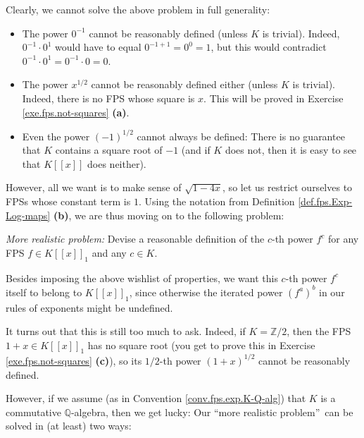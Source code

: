 Clearly, we cannot solve the above problem in full generality:

\begin{itemize}
\item The power $0^{-1}$ cannot be reasonably defined (unless $K$ is trivial).
Indeed, $0^{-1}\cdot0^{1}$ would have to equal $0^{-1+1}=0^{0}=1$, but this
would contradict $0^{-1}\cdot0^{1}=0^{-1}\cdot0=0$.

\item The power $x^{1/2}$ cannot be reasonably defined either (unless $K$ is
trivial). Indeed, there is no FPS whose square is $x$. This will be proved in
Exercise \ref{exe.fps.not-squares} \textbf{(a)}.

\item Even the power $\left(  -1\right)  ^{1/2}$ cannot always be defined:
There is no guarantee that $K$ contains a square root of $-1$ (and if $K$ does
not, then it is easy to see that $K\left[  \left[  x\right]  \right]  $ does neither).
\end{itemize}

However, all we want is to make sense of $\sqrt{1-4x}$, so let us restrict
ourselves to FPSs whose constant term is $1$. Using the notation from
Definition \ref{def.fps.Exp-Log-maps} \textbf{(b)}, we are thus moving on to
the following problem:

\begin{statement}
\textit{More realistic problem:} Devise a reasonable definition of the $c$-th
power $f^{c}$ for any FPS $f\in K\left[  \left[  x\right]  \right]  _{1}$ and
any $c\in K$.
\end{statement}

Besides imposing the above wishlist of properties, we want this $c$-th power
$f^{c}$ itself to belong to $K\left[  \left[  x\right]  \right]  _{1}$, since
otherwise the iterated power $\left(  f^{a}\right)  ^{b}$ in our rules of
exponents might be undefined.

It turns out that this is still too much to ask. Indeed, if $K=\mathbb{Z}/2$,
then the FPS $1+x\in K\left[  \left[  x\right]  \right]  _{1}$ has no square
root (you get to prove this in Exercise \ref{exe.fps.not-squares}
\textbf{(c)}), so its $1/2$-th power $\left(  1+x\right)  ^{1/2}$ cannot be
reasonably defined.

However, if we assume (as in Convention \ref{conv.fps.exp.K-Q-alg}) that $K$
is a commutative $\mathbb{Q}$-algebra, then we get lucky: Our
\textquotedblleft more realistic problem\textquotedblright\ can be solved in
(at least) two ways: \medskip

